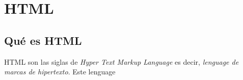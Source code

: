 
\chapter{HTML}
\label{cha:{HTML}}

\section{Qué es HTML}

HTML son las siglas de \textit{Hyper Text Markup Language} es decir, \textit{lenguage de marcas de hipertexto}. Este lenguage



